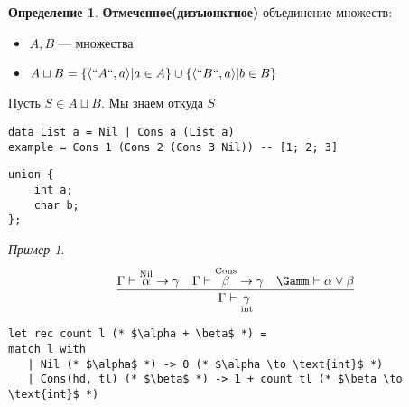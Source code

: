 \documentclass[oneside]{book}
\theoremstyle{plain}
\theoremstyle{remark}
\newtheorem*{examp}{Пример}
\theoremstyle{definition}
\newtheorem*{definition}{Определение}
\begin{document}
\begin{definition}
\textbf{Отмеченное(дизъюнктное)} объединение множеств: \\
\begin{itemize}
\item \(A, B\) --- множества
\item \(A \sqcup B = \{\langle ``A``, a \rangle| a\in A\}\cup\{\langle ``B``, a \rangle | b \in B\}\)
\end{itemize}
Пусть \(S \in A \sqcup B\). Мы знаем откуда \(S\)
\end{definition}
\begin{verbatim}
data List a = Nil | Cons a (List a)
example = Cons 1 (Cons 2 (Cons 3 Nil)) -- [1; 2; 3]
\end{verbatim}
\begin{verbatim}
union {
	int a;
	char b;
};
\end{verbatim}
\begin{examp}
\[
\frac{\Gamma \vdash \overset{\text{Nil}}{\alpha} \to \gamma\quad \Gamma \vdash \overset{\text{Cons}}{\beta} \to \gamma\quad \Gamm \vdash \alpha \vee \beta}{\Gamma \vdash \underset{\text{int}}{\gamma}}
\]
\begin{verbatim}
let rec count l (* $\alpha + \beta$ *) =
match l with
   | Nil (* $\alpha$ *) -> 0 (* $\alpha \to \text{int}$ *)
   | Cons(hd, tl) (* $\beta$ *) -> 1 + count tl (* $\beta \to \text{int}$ *)
\end{verbatim}
\end{examp}
\end{document}

